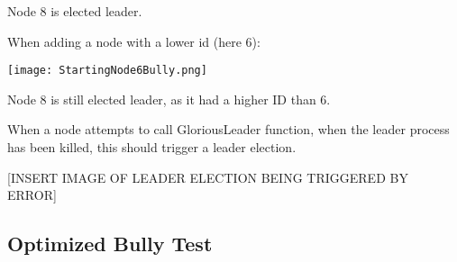 Node 8 is elected leader. 

When adding a node with a lower id (here 6):

\begin{center}
	\texttt{[image: StartingNode6Bully.png]}
\end{center}

Node 8 is still elected leader, as it had a higher ID than 6.

When a node attempts to call GloriousLeader function, when the leader process has been killed, this should trigger a leader election. 

[INSERT IMAGE OF LEADER ELECTION BEING TRIGGERED BY ERROR]

\subsection{Optimized Bully Test}
